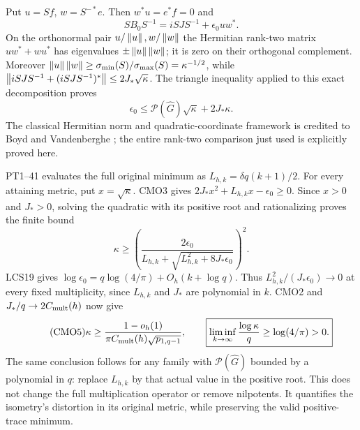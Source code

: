 Put $u=Sf$, $w=S^{-*}e$. Then
$w^*u=e^*f=0$ and
\[
 SB_0S^{-1}=iSJS^{-1}+\epsilon_0uw^*.
\]
On the orthonormal pair $u/\left\lVert u\right\rVert,w/\left\lVert w\right\rVert$ the Hermitian
rank-two matrix $uw^*+wu^*$ has eigenvalues
$\pm\left\lVert u\right\rVert\left\lVert w\right\rVert$; it is zero on their orthogonal complement.
Moreover
$\left\lVert u\right\rVert\left\lVert w\right\rVert\ge\sigma_{\min}(S)/\sigma_{\max}(S)
=\kappa^{-1/2}$, while
$\left\lVert iSJS^{-1}+(iSJS^{-1})^*\right\rVert\le2J_*\sqrt\kappa$.
The triangle inequality applied to this exact decomposition proves
\begin{equation}\tag{CMO3}
 \boxed{\epsilon_0\le
       \mathcal P(\widehat G)\sqrt\kappa+2J_*\kappa.}
\end{equation}
The classical Hermitian norm and quadratic-coordinate framework is
credited to Boyd and Vandenberghe \cite[Appendix A.5]{a04cmo:Boyd};
the entire rank-two comparison just used is explicitly proved here.

PT1--41 evaluates the full original minimum as
$L_{h,k}=\delta q(k+1)/2$. For every attaining metric, put
$x=\sqrt\kappa$. CMO3 gives $2J_*x^2+L_{h,k}x-\epsilon_0\ge0$.
Since $x>0$ and $J_*>0$, solving the quadratic with its positive
root and rationalizing proves the finite bound
\begin{equation}\tag{CMO4}
 \boxed{\kappa\ge
 \left(\frac{2\epsilon_0}
 {L_{h,k}+\sqrt{L_{h,k}^2+8J_*\epsilon_0}}\right)^2.}
\end{equation}
LCS19 gives
$\log\epsilon_0=q\log(4/\pi)+O_h(k+\log q)$.
Thus $L_{h,k}^2/(J_*\epsilon_0)\to0$ at every fixed
multiplicity, since $L_{h,k}$ and $J_*$ are polynomial in $k$.
CMO2 and $J_*/q\to2C_{\rm mult}(h)$ now give
\begin{equation}\tag{CMO5}
 \kappa\ge
 \frac{1-o_h(1)}{\pi C_{\rm mult}(h)\sqrt{p_{1,q-1}}},
 \qquad
 \boxed{\liminf_{k\to\infty}\frac{\log\kappa}{q}
                         \ge\log(4/\pi)>0.}
\end{equation}
The same conclusion follows for any family with
$\mathcal P(\widehat G)$ bounded by a polynomial in $q$:
replace $L_{h,k}$ by that actual value in the positive root.
This does not change the full multiplication operator or remove
nilpotents. It quantifies the isometry's distortion in its original
metric, while preserving the valid positive-trace minimum.

